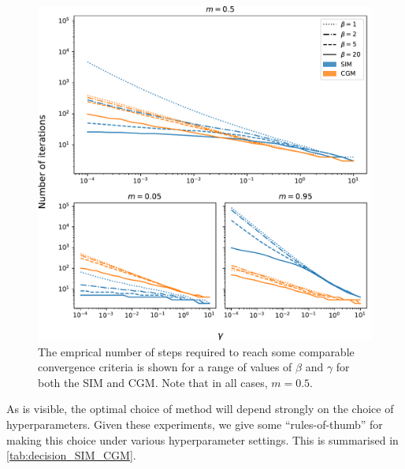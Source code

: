 \begin{figure}[hb]
    \begin{center} 
    \includegraphics[width=0.9\linewidth]{Figures/experimental_its_for_conv.pdf}
    \end{center}
    \caption{\small{ The emprical number of steps required to reach some comparable convergence criteria is shown for a range of values of $\beta$ and $\gamma$ for both the SIM and CGM. Note that in all cases, $m=0.5$. }}
    \label{fig:it_gamma_plot}
\end{figure}

\vspace{0.5cm}

As is visible, the optimal choice of method will depend strongly on the choice of hyperparameters. Given these experiments, we give some ``rules-of-thumb'' for making this choice under various hyperparameter settings. This is summarised in \cref{tab:decision_SIM_CGM}. 


